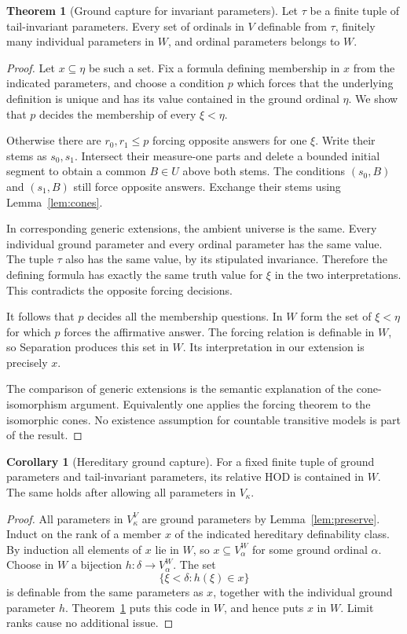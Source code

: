 \documentclass[11pt,letterpaper]{article}
\theoremstyle{definition}
\newtheorem{theorem}[definition]{Theorem}
\newtheorem{corollary}[definition]{Corollary}
\numberwithin{equation}{section}
\begin{document}
\begin{theorem}[Ground capture for invariant parameters]\label{thm:capture}
Let $\tau$ be a finite tuple of tail-invariant parameters. Every set of ordinals in $V$ definable from $\tau$, finitely many individual parameters in $W$, and ordinal parameters belongs to $W$.
\end{theorem}
\begin{proof}
Let $x\subseteq\eta$ be such a set. Fix a formula defining membership in $x$ from the indicated parameters, and choose a condition $p$ which forces that the underlying definition is unique and has its value contained in the ground ordinal $\eta$. We show that $p$ decides the membership of every $\xi<\eta$.

Otherwise there are $r_0,r_1\leq p$ forcing opposite answers for one $\xi$. Write their stems as $s_0,s_1$. Intersect their measure-one parts and delete a bounded initial segment to obtain a common $B\in U$ above both stems. The conditions $(s_0,B)$ and $(s_1,B)$ still force opposite answers. Exchange their stems using Lemma~\ref{lem:cones}.

In corresponding generic extensions, the ambient universe is the same. Every individual ground parameter and every ordinal parameter has the same value. The tuple $\tau$ also has the same value, by its stipulated invariance. Therefore the defining formula has exactly the same truth value for $\xi$ in the two interpretations. This contradicts the opposite forcing decisions.

It follows that $p$ decides all the membership questions. In $W$ form the set of $\xi<\eta$ for which $p$ forces the affirmative answer. The forcing relation is definable in $W$, so Separation produces this set in $W$. Its interpretation in our extension is precisely $x$.

The comparison of generic extensions is the semantic explanation of the cone-isomorphism argument. Equivalently one applies the forcing theorem to the isomorphic cones. No existence assumption for countable transitive models is part of the result.
\end{proof}

\begin{corollary}[Hereditary ground capture]\label{cor:hodcapture}
For a fixed finite tuple of ground parameters and tail-invariant parameters, its relative HOD is contained in $W$. The same holds after allowing all parameters in $V_\kappa$.
\end{corollary}
\begin{proof}
All parameters in $V_\kappa^V$ are ground parameters by Lemma~\ref{lem:preserve}. Induct on the rank of a member $x$ of the indicated hereditary definability class. By induction all elements of $x$ lie in $W$, so $x\subseteq V_\alpha^W$ for some ground ordinal $\alpha$. Choose in $W$ a bijection $h:\delta\to V_\alpha^W$. The set
\[
 \{\xi<\delta:h(\xi)\in x\}
\]
is definable from the same parameters as $x$, together with the individual ground parameter $h$. Theorem~\ref{thm:capture} puts this code in $W$, and hence puts $x$ in $W$. Limit ranks cause no additional issue.
\end{proof}
\end{document}
